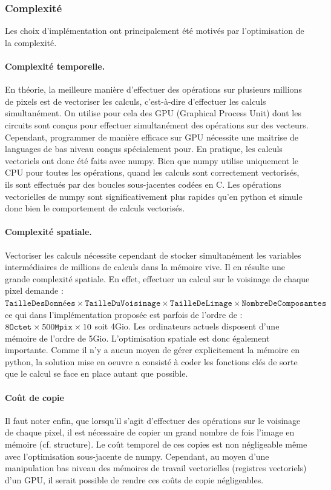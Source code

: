 \documentclass{article}
\begin{document}
\begin{multicols}{2}
\subsubsection{Complexité}

Les choix d'implémentation ont principalement été motivés par l'optimisation de la complexité.

\paragraph{Complexité temporelle.} En théorie, la meilleure manière d'effectuer des opérations sur plusieurs millions de pixels est de vectoriser les calculs, c'est-à-dire d'effectuer les calculs simultanément. On utilise pour cela des GPU (Graphical Process Unit) dont les circuits sont conçus pour effectuer simultanément des opérations sur des vecteurs. Cependant, programmer de manière efficace sur GPU nécessite une maitrise de languages de bas niveau conçus spécialement pour. En pratique, les calculs vectoriels ont donc été faits avec numpy. Bien que numpy utilise uniquement le CPU pour toutes les opérations, quand les calculs sont correctement vectorisés, ils sont effectués par des boucles sous-jacentes codées en C. Les opérations vectorielles de numpy sont significativement plus rapides qu'en python et simule donc bien le comportement de calculs vectorisés.

	\paragraph{Complexité spatiale.} Vectoriser les calculs nécessite cependant de stocker simultanément les variables intermédiaires de millions de calculs dans la mémoire vive. Il en résulte une grande complexité spatiale. En effet, effectuer un calcul sur le voisinage de chaque pixel demande : $\mathtt{TailleDesDonnées} \times \mathtt{TailleDuVoisinage} \times \mathtt{TailleDeLimage} \times \mathtt{NombreDeComposantes}$ ce qui dans l'implémentation proposée est parfois de l'ordre de :  $8 \mathtt{Octet} \times 500 \time 10 \mathtt{Mpix} \times 10$ soit 4Gio. Les ordinateurs actuels disposent d'une mémoire de l'ordre de 5Gio. L'optimisation spatiale est donc également importante. Comme il n'y a aucun moyen de gérer explicitement la mémoire en python, la solution mise en oeuvre a consisté à coder les fonctions clés de sorte que le calcul se face en place autant que possible.

\paragraph{Coût de copie} Il faut noter enfin, que lorsqu'il s'agit d'effectuer des opérations sur le voisinage de chaque pixel, il est nécessaire de copier un grand nombre de fois l'image en mémoire (cf. structure). Le coût temporel de ces copies est non négligeable même avec l'optimisation sous-jacente de numpy. Cependant, au moyen d'une manipulation bas niveau des mémoires de travail vectorielles (registres vectoriels) d'un GPU, il serait possible de rendre ces coûts de copie négligeables.


\end{multicols}
\end{document}
